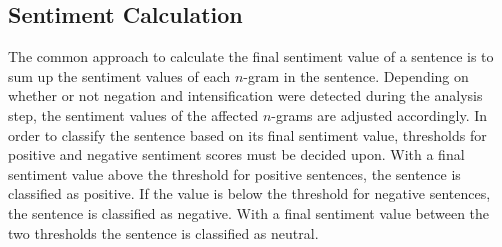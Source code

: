 \subsection{Sentiment Calculation}
The common approach to calculate the final sentiment value of a sentence is to sum up the sentiment values of each $n$-gram in the sentence. Depending on whether or not negation and intensification were detected during the analysis step, the sentiment values of the affected $n$-grams are adjusted accordingly. In order to classify the sentence based on its final sentiment value, thresholds for positive and negative sentiment scores must be decided upon. With a final sentiment value above the threshold for positive sentences, the sentence is classified as positive. If the value is below the threshold for negative sentences, the sentence is classified as negative. With a final sentiment value between the two thresholds the sentence is classified as neutral. 

\glsresetall
